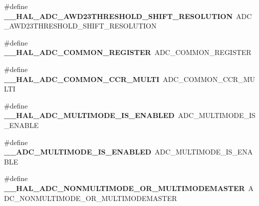 \begin{DoxyCompactItemize}
\item 
\#define {\bfseries \+\_\+\+\_\+\+H\+A\+L\+\_\+\+A\+D\+C\+\_\+\+A\+W\+D23\+T\+H\+R\+E\+S\+H\+O\+L\+D\+\_\+\+S\+H\+I\+F\+T\+\_\+\+R\+E\+S\+O\+L\+U\+T\+I\+ON}~A\+D\+C\+\_\+\+A\+W\+D23\+T\+H\+R\+E\+S\+H\+O\+L\+D\+\_\+\+S\+H\+I\+F\+T\+\_\+\+R\+E\+S\+O\+L\+U\+T\+I\+ON\hypertarget{group___h_a_l___a_d_c___aliased___macros_ga4038d6abc1b95e035a2a0b51fb999db2}{}\label{group___h_a_l___a_d_c___aliased___macros_ga4038d6abc1b95e035a2a0b51fb999db2}

\item 
\#define {\bfseries \+\_\+\+\_\+\+H\+A\+L\+\_\+\+A\+D\+C\+\_\+\+C\+O\+M\+M\+O\+N\+\_\+\+R\+E\+G\+I\+S\+T\+ER}~A\+D\+C\+\_\+\+C\+O\+M\+M\+O\+N\+\_\+\+R\+E\+G\+I\+S\+T\+ER\hypertarget{group___h_a_l___a_d_c___aliased___macros_ga00ebbedf4015e4538720e7a6dbacce59}{}\label{group___h_a_l___a_d_c___aliased___macros_ga00ebbedf4015e4538720e7a6dbacce59}

\item 
\#define {\bfseries \+\_\+\+\_\+\+H\+A\+L\+\_\+\+A\+D\+C\+\_\+\+C\+O\+M\+M\+O\+N\+\_\+\+C\+C\+R\+\_\+\+M\+U\+L\+TI}~A\+D\+C\+\_\+\+C\+O\+M\+M\+O\+N\+\_\+\+C\+C\+R\+\_\+\+M\+U\+L\+TI\hypertarget{group___h_a_l___a_d_c___aliased___macros_ga8bf50f7c58849d4cd141a421d55b148d}{}\label{group___h_a_l___a_d_c___aliased___macros_ga8bf50f7c58849d4cd141a421d55b148d}

\item 
\#define {\bfseries \+\_\+\+\_\+\+H\+A\+L\+\_\+\+A\+D\+C\+\_\+\+M\+U\+L\+T\+I\+M\+O\+D\+E\+\_\+\+I\+S\+\_\+\+E\+N\+A\+B\+L\+ED}~A\+D\+C\+\_\+\+M\+U\+L\+T\+I\+M\+O\+D\+E\+\_\+\+I\+S\+\_\+\+E\+N\+A\+B\+LE\hypertarget{group___h_a_l___a_d_c___aliased___macros_ga79f75f2e379c482c38441c050efc7225}{}\label{group___h_a_l___a_d_c___aliased___macros_ga79f75f2e379c482c38441c050efc7225}

\item 
\#define {\bfseries \+\_\+\+\_\+\+A\+D\+C\+\_\+\+M\+U\+L\+T\+I\+M\+O\+D\+E\+\_\+\+I\+S\+\_\+\+E\+N\+A\+B\+L\+ED}~A\+D\+C\+\_\+\+M\+U\+L\+T\+I\+M\+O\+D\+E\+\_\+\+I\+S\+\_\+\+E\+N\+A\+B\+LE\hypertarget{group___h_a_l___a_d_c___aliased___macros_gaa5b9fcac48711d597023aecdb11afc51}{}\label{group___h_a_l___a_d_c___aliased___macros_gaa5b9fcac48711d597023aecdb11afc51}

\item 
\#define {\bfseries \+\_\+\+\_\+\+H\+A\+L\+\_\+\+A\+D\+C\+\_\+\+N\+O\+N\+M\+U\+L\+T\+I\+M\+O\+D\+E\+\_\+\+O\+R\+\_\+\+M\+U\+L\+T\+I\+M\+O\+D\+E\+M\+A\+S\+T\+ER}~A\+D\+C\+\_\+\+N\+O\+N\+M\+U\+L\+T\+I\+M\+O\+D\+E\+\_\+\+O\+R\+\_\+\+M\+U\+L\+T\+I\+M\+O\+D\+E\+M\+A\+S\+T\+ER\hypertarget{group___h_a_l___a_d_c___aliased___macros_ga3dceabcf80e81b5a911bbe5ad3ff311a}{}\label{group___h_a_l___a_d_c___aliased___macros_ga3dceabcf80e81b5a911bbe5ad3ff311a}


\end{DoxyCompactItemize}

